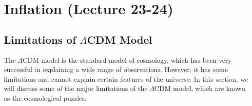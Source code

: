 
\chapter{Inflation (Lecture 23-24)}

\section{Limitations of $\Lambda$CDM Model}
The $\Lambda$CDM model is the standard model of cosmology, which has been very successful in explaining a wide range of observations. However, it has some limitations and cannot explain certain features of the universe. In this section, we will discuss some of the major limitations of the $\Lambda$CDM model, which are known as the cosmological puzzles. 


